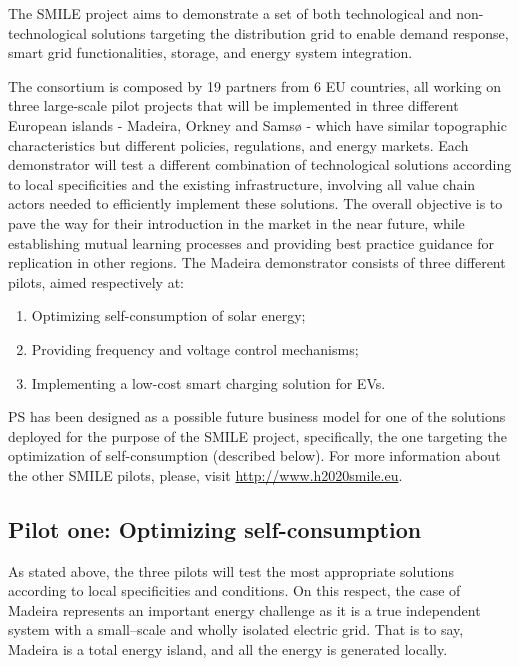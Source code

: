 The SMILE project aims to demonstrate a set of both technological and non-technological solutions targeting the distribution grid to enable demand response, smart grid functionalities, storage, and energy system integration.



The consortium is composed by 19 partners from 6 EU countries, all working on three large-scale pilot projects that will be implemented in three different European islands - Madeira, Orkney and Samsø - which have similar topographic characteristics but different policies, regulations, and energy markets. Each demonstrator will test a different combination of technological solutions according to local specificities and the existing infrastructure, involving all value chain actors needed to efficiently implement these solutions. The overall objective is to pave the way for their introduction in the market in the near future, while establishing mutual learning processes and providing best practice guidance for replication in other regions. The Madeira demonstrator consists of three different pilots, aimed respectively at:

\begin{enumerate}
\item Optimizing self-consumption of solar energy;
\item Providing frequency and voltage control mechanisms;
\item Implementing a low-cost smart charging solution for \acp{EV}.
\end{enumerate}

\ac{PS} has been designed as a possible future business model for one of the solutions deployed for the purpose of the SMILE project, specifically, the one targeting the optimization of self-consumption (described below). For more information about the other SMILE pilots, please, visit \url{http://www.h2020smile.eu}.


\subsection{Pilot one: Optimizing self-consumption}

As stated above, the three pilots will test the most appropriate solutions according to local specificities and conditions. On this respect, the case of Madeira represents an important energy challenge as it is a true independent system with a small--scale and wholly isolated electric grid. That is to say, Madeira is a total energy island, and all the energy is generated locally.



